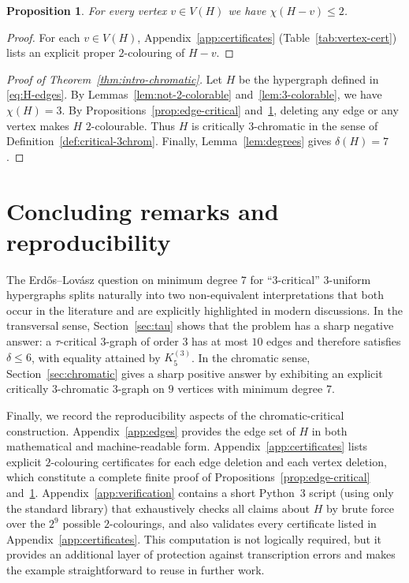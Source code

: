 \documentclass[11pt]{amsart}
\newtheorem{proposition}[theorem]{Proposition}
\theoremstyle{definition}
\theoremstyle{remark}
\newcommand{\V}{V}
\newcommand{\del}{\delta}
\begin{document}
\begin{proposition}\label{prop:vertex-critical}
For every vertex $v\in \V(H)$ we have $\chi(H-v)\le 2$.
\end{proposition}

\begin{proof}
For each $v\in \V(H)$, Appendix~\ref{app:certificates} (Table~\ref{tab:vertex-cert}) lists an explicit proper $2$-colouring of $H-v$.
\end{proof}

\begin{proof}[Proof of Theorem~\ref{thm:intro-chromatic}]
Let $H$ be the hypergraph defined in \eqref{eq:H-edges}.
By Lemmas~\ref{lem:not-2-colorable} and~\ref{lem:3-colorable}, we have $\chi(H)=3$.
By Propositions~\ref{prop:edge-critical} and~\ref{prop:vertex-critical}, deleting any edge or any vertex makes $H$ $2$-colourable.
Thus $H$ is critically $3$-chromatic in the sense of Definition~\ref{def:critical-3chrom}.
Finally, Lemma~\ref{lem:degrees} gives $\del(H)=7$.
\end{proof}

\section{Concluding remarks and reproducibility}\label{sec:concluding}

The Erd\H{o}s--Lov\'asz question on minimum degree $7$ for ``$3$-critical'' $3$-uniform hypergraphs splits naturally into two non-equivalent interpretations that both occur in the literature and are explicitly highlighted in modern discussions.\cite{ErdosProblems834}
In the transversal sense, Section~\ref{sec:tau} shows that the problem has a sharp negative answer: a $\tau$-critical $3$-graph of order $3$ has at most $10$ edges and therefore satisfies $\del\le 6$, with equality attained by $K^{(3)}_5$.
In the chromatic sense, Section~\ref{sec:chromatic} gives a sharp positive answer by exhibiting an explicit critically $3$-chromatic $3$-graph on $9$ vertices with minimum degree $7$.

Finally, we record the reproducibility aspects of the chromatic-critical construction.
Appendix~\ref{app:edges} provides the edge set of $H$ in both mathematical and machine-readable form.
Appendix~\ref{app:certificates} lists explicit $2$-colouring certificates for each edge deletion and each vertex deletion, which constitute a complete finite proof of Propositions~\ref{prop:edge-critical} and~\ref{prop:vertex-critical}.
Appendix~\ref{app:verification} contains a short Python~3 script (using only the standard library) that exhaustively checks all claims about $H$ by brute force over the $2^9$ possible $2$-colourings, and also validates every certificate listed in Appendix~\ref{app:certificates}.
This computation is not logically required, but it provides an additional layer of protection against transcription errors and makes the example straightforward to reuse in further work.
\end{document}
